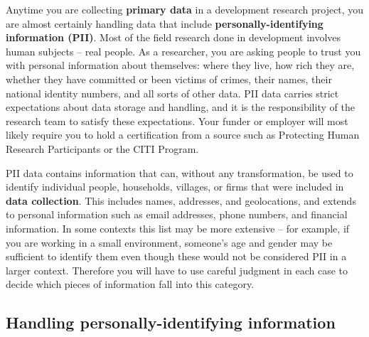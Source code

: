 Anytime you are collecting \textbf{primary data} in a development research project,
you are almost certainly handling data that include \textbf{personally-identifying information (PII)}.
Most of the field research done in development involves human subjects -- real people.
As a researcher, you are asking people to trust you with personal information about themselves:
where they live, how rich they are, whether they have committed or been victims of crimes,
their names, their national identity numbers, and all sorts of other data.
PII data carries strict expectations about data storage and handling,
and it is the responsibility of the research team to satisfy these expectations.
Your funder or employer will most likely require you to hold a certification from a source
such as Protecting Human Research Participants
or the CITI Program.

PII data contains information that can, without any transformation, be used to identify
individual people, households, villages, or firms that were included in \textbf{data collection}.
This includes names, addresses, and geolocations, and extends to personal information
such as email addresses, phone numbers, and financial information.
In some contexts this list may be more extensive --
for example, if you are working in a small environment,
someone's age and gender may be sufficient to identify them
even though these would not be considered PII in a larger context.
Therefore you will have to use careful judgment in each case
to decide which pieces of information fall into this category.

\subsection{Handling personally-identifying information}

